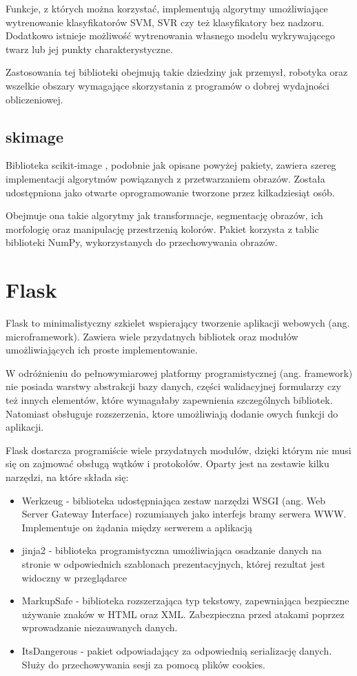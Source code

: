 Funkcje, z których można korzystać, implementują algorytmy umożliwiające wytrenowanie klasyfikatorów SVM, SVR czy też klasyfikatory bez nadzoru. Dodatkowo istnieje możliwość wytrenowania własnego modelu wykrywającego twarz lub jej punkty charakterystyczne.

Zastosowania tej biblioteki obejmują takie dziedziny jak przemysł, robotyka oraz wszelkie obszary wymagające skorzystania z programów o dobrej wydajności obliczeniowej.

\subsection{skimage}
Biblioteka scikit-image \cite{skimage}, podobnie jak opisane powyżej pakiety, zawiera szereg implementacji algorytmów powiązanych z przetwarzaniem obrazów. Została udostępniona jako otwarte oprogramowanie tworzone przez kilkadziesiąt osób. 

Obejmuje ona takie algorytmy jak transformacje, segmentację obrazów, ich morfologię oraz manipulację przestrzenią kolorów. Pakiet korzysta z tablic biblioteki NumPy, wykorzystanych do przechowywania obrazów.

\section{Flask}
Flask \cite{flask} to minimalistyczny szkielet wspierający tworzenie aplikacji webowych (ang. microframework). Zawiera wiele przydatnych bibliotek oraz modułów umożliwiających ich proste implementowanie.

W odróżnieniu do pełnowymiarowej platformy programistycznej (ang. framework) nie posiada warstwy abstrakcji bazy danych, części walidacyjnej formularzy czy też innych elementów, które wymagałaby zapewnienia szczególnych bibliotek. Natomiast obsługuje rozszerzenia, ktore umożliwiają dodanie owych funkcji do aplikacji.

Flask dostarcza programiście wiele przydatnych modułów, dzięki którym nie musi się on zajmować obsługą wątków i protokołów. Oparty jest na zestawie kilku narzędzi, na które składa się:
\begin{itemize}
\item Werkzeug - biblioteka udostępniająca zestaw narzędzi WSGI (ang. Web Server Gateway Interface) rozumianych jako interfejs bramy serwera WWW. Implementuje on żądania między serwerem a aplikacją
\item jinja2 - biblioteka programistyczna umożliwiająca osadzanie danych na stronie w odpowiednich szablonach prezentacyjnych, której rezultat jest widoczny w przeglądarce
\item MarkupSafe - biblioteka rozszerzająca typ tekstowy, zapewniająca bezpieczne używanie znaków w HTML oraz XML. Zabezpieczna przed atakami poprzez wprowadzanie niezauwanych danych.
\item ItsDangerous - pakiet odpowiadający za odpowiednią serializację danych. Służy do przechowywania sesji za pomocą plików cookies.
\end{itemize}

